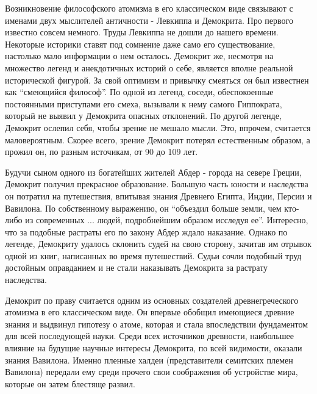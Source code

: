 Возникновение философского атомизма в его классическом виде связывают с именами двух мыслителей античности - Левкиппа и Демокрита.
Про первого известно совсем немного.
Труды Левкиппа не дошли до нашего времени.
Некоторые историки ставят под сомнение даже само его существование, настолько мало информации о нем осталось.
Демокрит же, несмотря на множество легенд и анекдотичных историй о себе, является вполне реальной исторической фигурой. 
За свой оптимизм и привычку смеяться он был известнен как ``смеющийся философ''.
По одной из легенд, соседи, обеспокоенные постоянными приступами его смеха, вызывали к нему самого Гиппократа, который не выявил у Демокрита опасных отклонений.
По другой легенде, Демокрит ослепил себя, чтобы зрение не мешало мысли. 
Это, впрочем, считается маловероятным.
Скорее всего, зрение Демокрит потерял естественным образом, а прожил он, по разным источикам, от 90 до 109 лет.

Будучи сыном одного из богатейших жителей Абдер - города на севере Греции, Демокрит получил прекрасное образование.
Большую часть юности и наследства он потратил на путешествия, впитывая знания Древнего Египта, Индии, Персии и Вавилона.
По собственному выражению, он ``объездил больше земли, чем кто-либо из современных ... людей, подробнейшим образом исследуя ее''.
Интересно, что за подобные растраты его по закону Абдер ждало наказание.
Однако по легенде, Демокриту удалось склонить судей на свою сторону, зачитав им отрывок одной из книг, написанных во время путешествий.
Судьи сочли подобный труд достойным оправданием и не стали наказывать Демокрита за растрату наследства. 

Демокрит по праву считается одним из основных создателей древнегреческого атомизма в его классическом виде.
Он впервые обобщил имеющиеся древние знания и выдвинул гипотезу о атоме, которая и стала впоследствии фундаментом для всей последующей науки.
Среди всех источников древности, наибольшее влияние на будущие научные интересы Демокрита, по всей видимости, оказали знания Вавилона.
Именно пленные халдеи (представители семитских племен Вавилона) передали ему среди прочего свои соображения об устройстве мира, которые он затем блестяще развил.

